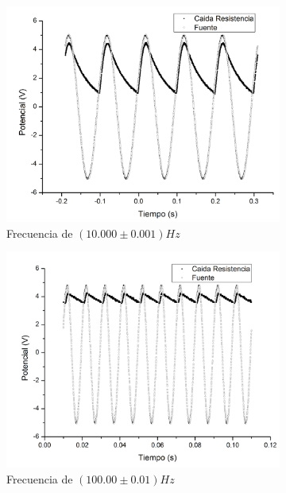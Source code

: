 \documentclass[11pt,a4paper]{article}
\begin{document}
\begin{figure}
\begin{subfigure}{0.33\textwidth}
\includegraphics[scale=0.25]{Rectificacion_10hz}
  \caption{Frecuencia de $(10.000\pm0.001)Hz$}
  \label{subfig:rec_10}
\end{subfigure}
\begin{subfigure}{0.33\textwidth}
\includegraphics[scale=0.25]{Rectificacion_100hz}
  \caption{Frecuencia de $(100.00\pm0.01)Hz$}
  \label{subfig:rec_100}
\end{subfigure}
\begin{subfigure}{0.33\textwidth}

\end{subfigure}
\end{figure}
\end{document}
